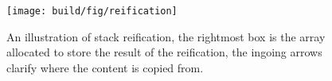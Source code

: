 \begin{figure}
\begin{mdframed}
  \texttt{[image: build/fig/reification]}
  \caption{An illustration of stack reification, the rightmost box
  is the array allocated to store the result of the reification, the
  ingoing arrows clarify where the content is copied from.}
  \label{fig:reification}
\end{mdframed}
\end{figure}



